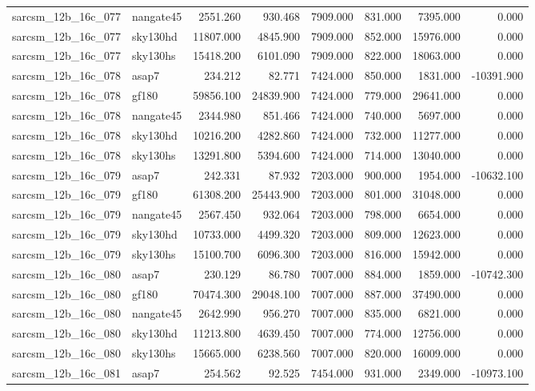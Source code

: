 \begin{tabular}{llrrrrrr}
sarcsm\_12b\_16c\_077 & nangate45 & 2551.260 & 930.468 & 7909.000 & 831.000 & 7395.000 & 0.000 \\
sarcsm\_12b\_16c\_077 & sky130hd & 11807.000 & 4845.900 & 7909.000 & 852.000 & 15976.000 & 0.000 \\
sarcsm\_12b\_16c\_077 & sky130hs & 15418.200 & 6101.090 & 7909.000 & 822.000 & 18063.000 & 0.000 \\
sarcsm\_12b\_16c\_078 & asap7 & 234.212 & 82.771 & 7424.000 & 850.000 & 1831.000 & -10391.900 \\
sarcsm\_12b\_16c\_078 & gf180 & 59856.100 & 24839.900 & 7424.000 & 779.000 & 29641.000 & 0.000 \\
sarcsm\_12b\_16c\_078 & nangate45 & 2344.980 & 851.466 & 7424.000 & 740.000 & 5697.000 & 0.000 \\
sarcsm\_12b\_16c\_078 & sky130hd & 10216.200 & 4282.860 & 7424.000 & 732.000 & 11277.000 & 0.000 \\
sarcsm\_12b\_16c\_078 & sky130hs & 13291.800 & 5394.600 & 7424.000 & 714.000 & 13040.000 & 0.000 \\
sarcsm\_12b\_16c\_079 & asap7 & 242.331 & 87.932 & 7203.000 & 900.000 & 1954.000 & -10632.100 \\
sarcsm\_12b\_16c\_079 & gf180 & 61308.200 & 25443.900 & 7203.000 & 801.000 & 31048.000 & 0.000 \\
sarcsm\_12b\_16c\_079 & nangate45 & 2567.450 & 932.064 & 7203.000 & 798.000 & 6654.000 & 0.000 \\
sarcsm\_12b\_16c\_079 & sky130hd & 10733.000 & 4499.320 & 7203.000 & 809.000 & 12623.000 & 0.000 \\
sarcsm\_12b\_16c\_079 & sky130hs & 15100.700 & 6096.300 & 7203.000 & 816.000 & 15942.000 & 0.000 \\
sarcsm\_12b\_16c\_080 & asap7 & 230.129 & 86.780 & 7007.000 & 884.000 & 1859.000 & -10742.300 \\
sarcsm\_12b\_16c\_080 & gf180 & 70474.300 & 29048.100 & 7007.000 & 887.000 & 37490.000 & 0.000 \\
sarcsm\_12b\_16c\_080 & nangate45 & 2642.990 & 956.270 & 7007.000 & 835.000 & 6821.000 & 0.000 \\
sarcsm\_12b\_16c\_080 & sky130hd & 11213.800 & 4639.450 & 7007.000 & 774.000 & 12756.000 & 0.000 \\
sarcsm\_12b\_16c\_080 & sky130hs & 15665.000 & 6238.560 & 7007.000 & 820.000 & 16009.000 & 0.000 \\
sarcsm\_12b\_16c\_081 & asap7 & 254.562 & 92.525 & 7454.000 & 931.000 & 2349.000 & -10973.100 \\

\end{tabular}

